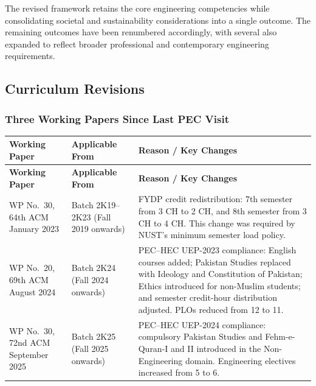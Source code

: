 The revised framework retains the core engineering competencies while
consolidating societal and sustainability considerations into a single
outcome. The remaining outcomes have been renumbered accordingly, with
several also expanded to reflect broader professional and contemporary
engineering requirements.

\subsection{Curriculum Revisions}
\label{subsec:curriculum-revisions}

\subsubsection{Three Working Papers Since Last PEC Visit}
\label{subsubsec:working-papers}

\begin{longtable}{|p{4.0cm}|p{3.5cm}|p{7.5cm}|}
\hline
\textbf{Working Paper} &
\textbf{Applicable From} &
\textbf{Reason / Key Changes} \\
\hline
\endfirsthead

\hline
\textbf{Working Paper} &
\textbf{Applicable From} &
\textbf{Reason / Key Changes} \\
\hline
\endhead

WP No.~30, 64th ACM
\newline 23 January 2023
&
Batch 2K19--2K23
\newline (Fall 2019 onwards)
&
FYDP credit redistribution: 7th semester
from 3 CH to 2 CH, and 8th semester
from 3 CH to 4 CH. This change was
required by NUST's minimum semester
load policy. \\
\hline

WP No.~20, 69th ACM
\newline 6 August 2024
&
Batch 2K24
\newline (Fall 2024 onwards)
&
PEC--HEC UEP-2023 compliance:
English courses added; Pakistan Studies
replaced with Ideology and Constitution
of Pakistan; Ethics introduced for
non-Muslim students; and semester
credit-hour distribution adjusted. PLOs reduced
from 12 to 11.\\
\hline

WP No.~30, 72nd ACM
\newline 4 September 2025
&
Batch 2K25
\newline (Fall 2025 onwards)
&
PEC--HEC UEP-2024 compliance:
compulsory Pakistan Studies and
Fehm-e-Quran-I and II introduced in the
Non-Engineering domain. Engineering electives
increased from 5 to 6. \\
\hline
\end{longtable}


